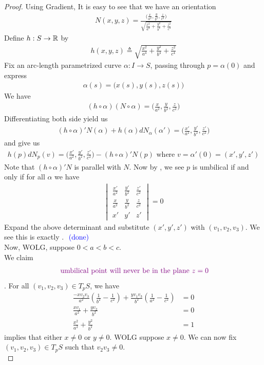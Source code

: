 \documentclass{report}
\begin{document}
\begin{proof}
Using Gradient, It is easy to see that we have an orientation 
\begin{align*}
N(x,y,z)= \frac{\Big(\frac{x}{a^2}, \frac{y}{b^2}, \frac{z}{c^2} \Big)}{\sqrt{\frac{x^2}{a^4}+ \frac{y^2}{b^4}+\frac{z^2}{c^4}} }
\end{align*}
Define $h:S\rightarrow \mathbb{R}$ by 
\begin{align*}
h(x,y,z)\triangleq  \sqrt{\frac{x^2}{a^4}+\frac{y^2}{b^4}+\frac{z^2}{c^4}} 
\end{align*}
Fix an arc-length parametrized curve $\alpha :I\rightarrow S$, passing through $p=\alpha (0)$ and express 
\begin{align*}
\alpha (s)=\Big(x(s),y(s),z(s) \Big)
\end{align*}
We have 
\begin{align*}
  (h\circ \alpha )(N\circ \alpha )= \Big(\frac{x}{a^2}, \frac{y}{b^2}, \frac{z}{c^2} \Big)
\end{align*}
Differentiating both side yield us 
\begin{align*}
(h\circ \alpha )'N(\alpha )+ h(\alpha ) dN_{\alpha }(\alpha ')= \Big(\frac{x'}{a^2},\frac{y'}{b^2},\frac{z'}{c^2} \Big)
\end{align*}
and give us 
\begin{align*}
h(p)dN_p (v)= \Big(\frac{x'}{a^2}, \frac{y'}{b^2}, \frac{z'}{c^2} \Big) - (h\circ \alpha )' N(p)\text{ where }v=\alpha '(0)=(x',y',z')
\end{align*}
Note that $(h\circ \alpha )'N$ is parallel with $N$. Now by , we see $p$ is umbilical if and only if for all $\alpha $ we have 
\begin{align*}
  \begin{vmatrix} 
    \frac{x'}{a^2} & \frac{y'}{b^2} & \frac{z'}{c^2}\\
    \frac{x}{a^2} & \frac{y}{b^2} & \frac{z}{c^2}\\
    x' & y' & z'
  \end{vmatrix}=0 
\end{align*}
Expand the above determinant and substitute $(x',y',z')$ with $(v_1,v_2,v_3)$. We see this is exactly . $\textcolor{blue}{\text{ (done) }}$\\


Now, WOLG, suppose $0<a<b<c$.\\

We claim 
\begin{align*}
\textcolor{violet}{\text{ umbilical point will never be in the plane }z=0}
\end{align*}
. For all $(v_1,v_2,v_3)\in T_pS$, we have 
\begin{align}
  \frac{-xv_2v_3}{a^2}(\frac{1}{b^2}-\frac{1}{c^2})+ \frac{yv_1v_3}{b^2}(\frac{1}{a^2}-\frac{1}{c^2})&=0\label{eq4}\\
  \frac{xv_1}{a^2}+ \frac{yv_2}{b^2}&=0\label{eq5}\\
  \frac{x^2}{a^2}+ \frac{y^2}{b^2}&=1 \label{eq6}
\end{align}
 implies that either $x\neq 0$ or $y\neq 0$. WOLG suppose $x\neq 0$. We can now fix $(v_1,v_2,v_3)\in T_pS$ such that $v_2v_3\neq 0$. \\


\end{proof}
\end{document}
